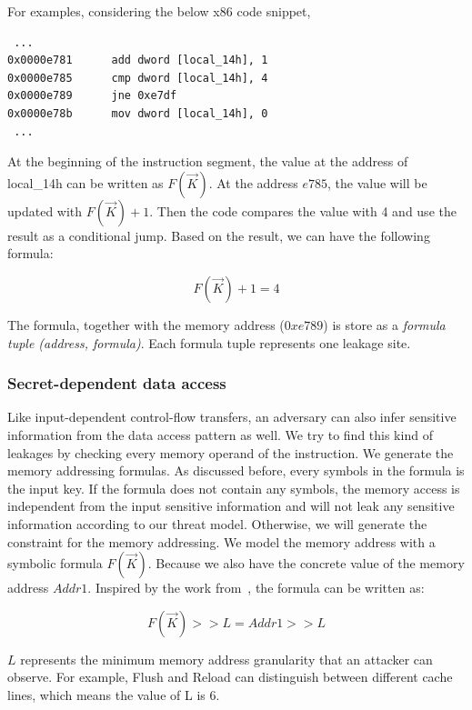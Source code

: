 For examples, considering the below x86 code snippet,

\begin{lstlisting}
 ...
0x0000e781      add dword [local_14h], 1
0x0000e785      cmp dword [local_14h], 4
0x0000e789      jne 0xe7df
0x0000e78b      mov dword [local_14h], 0
 ...
\end{lstlisting}

At the beginning of the instruction segment, the value at the address of local\_14h can be written as $F(\vec{K})$. At the address $e785$, the value will be updated with $F(\vec{K})+1$. Then the code compares 
the value with 4 and use the result as a conditional jump. Based on the result, we can have the following formula:

$$F(\vec{K}) + 1 = 4$$

The formula, together with the memory address ($0xe789$) is store as a \textit{formula tuple (address, formula)}. Each formula tuple represents one leakage site.

\subsubsection{Secret-dependent data access}
Like input-dependent control-flow transfers, an adversary can also infer sensitive information from the data access pattern as well. We try to find this kind of leakages by checking every memory operand of the instruction. We generate the memory addressing 
formulas. As discussed before, every symbols in the formula is the input key. If the formula does not contain any symbols, the memory access is independent 
from the input sensitive information and will not leak any sensitive information according to our threat model. Otherwise, we will generate the constraint for
the memory addressing. We model the memory address with a symbolic formula $F(\vec{K})$. Because we also have the concrete value of the memory address $Addr1$. 
Inspired by the work from~\cite{203878}, the formula can be written as:

$$F(\vec{K}) >> L = Addr1 >> L$$

$L$ represents the minimum memory address granularity that an attacker can observe. For example, Flush and Reload can distinguish between different cache lines, which means the value of L is 6.

